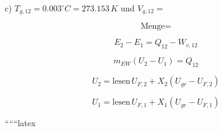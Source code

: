 c) \( T_{g,12} = 0.003^\circ C = 273.153 \, K \) und \( V_{g,12} = \)

\[ \text{Menge} = \]

\[ E_2 - E_1 = Q_{12} - W_{v,12} \]

\[ m_{EW} (U_2 - U_1) = Q_{12} \]

\[ U_2 = \text{lesen} \, U_{F,2} + X_2 (U_{gr} - U_{F,2}) \]

\[ U_1 = \text{lesen} \, U_{F,1} + X_1 (U_{gr} - U_{F,1}) \]

``````latex